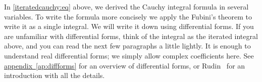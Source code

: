 \documentclass[12pt,openany]{book}
\theoremstyle{plain}
\theoremstyle{remark}
\theoremstyle{definition}
\theoremstyle{exercise}
\theoremstyle{example}
\newcommand{\appendixref}[1]{\hyperref[#1]{appendix~\ref*{#1}}}
\begin{document}

In \eqref{iteratedcauchy:eq} above,
we derived the Cauchy integral formula in several variables.  To
write the formula more concisely we apply the Fubini's theorem to write it as
a single integral.  We will write it down using differential forms.  If you
are unfamiliar with differential forms, think of the integral
as the iterated integral above, and you can read the next few paragraphs
a little lightly.
It is enough to understand real differential forms; we simply allow
complex coefficients here.
See \appendixref{ap:diffforms} for an overview of differential forms,
or
Rudin~\cite{Rudin:principles} for an introduction with all the details.
\end{document}
